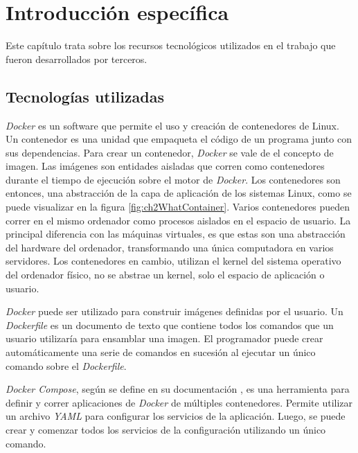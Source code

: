 \chapter{Introducción específica} %

\label{Chapter2}

Este capítulo trata sobre los recursos tecnológicos utilizados en el trabajo que fueron desarrollados por terceros.

\section{Tecnologías utilizadas}

\emph{Docker} es un software que permite el uso y creación de contenedores de Linux.
Un contenedor es una unidad que empaqueta el código de un programa junto con sus dependencias.
Para crear un contenedor, \emph{Docker} se vale de el concepto de imagen.
Las imágenes son entidades aisladas que corren como contenedores durante el tiempo de ejecución sobre el motor de \emph{Docker}.
Los contenedores son entonces, una abstracción de la capa de aplicación de los sistemas Linux, como se puede visualizar en la figura \ref{fig:ch2WhatContainer}.
Varios contenedores pueden correr en el mismo ordenador como procesos aislados en el espacio de usuario.
La principal diferencia con las máquinas virtuales, es que estas son una abstracción del hardware del ordenador, transformando una única computadora en varios servidores.
Los contenedores en cambio, utilizan el kernel del sistema operativo del ordenador físico, no se abstrae un kernel, solo el espacio de aplicación o usuario.

\emph{Docker} puede ser utilizado para construir imágenes definidas por el usuario.
Un \emph{Dockerfile} es un documento de texto que contiene todos los comandos que un usuario utilizaría para ensamblar una imagen.
El programador puede crear automáticamente una serie de comandos en sucesión al ejecutar un único comando sobre el \emph{Dockerfile}. 

\emph{Docker Compose}, según se define en su documentación \citep{WEBSITE:WhatDockerCompose}, es una herramienta para definir y correr aplicaciones de \emph{Docker} de múltiples contenedores.
Permite utilizar un archivo \emph{YAML} para configurar los servicios de la aplicación.
Luego, se puede crear y comenzar todos los servicios de la configuración utilizando un único comando.

